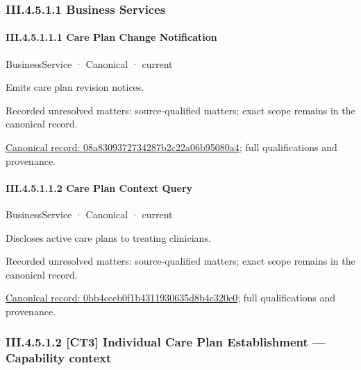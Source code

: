 \subsubsection*{III.4.5.1.1 Business Services}
\label{navigation:III.4.5.1.1}

\paragraph*{III.4.5.1.1.1 Care Plan Change Notification}
\label{navigation:III.4.5.1.1.1}

\label{element:08a8309372734287b2c22a06b95080a4}
{\small BusinessService · Canonical · current}\par

Emits care plan revision notices.


{\small Recorded unresolved matters: source-qualified matters; exact scope remains in the canonical record.}\par
{\footnotesize \href{../../../../../../../continuum/business/business-service/08a8309372734287b2c22a06b95080a4.md}{Canonical record: 08a8309372734287b2c22a06b95080a4}; full qualifications and provenance.}\par
\paragraph*{III.4.5.1.1.2 Care Plan Context Query}
\label{navigation:III.4.5.1.1.2}

\label{element:0bb4cceb0f1b4311930635d8b4c320e0}
{\small BusinessService · Canonical · current}\par

Discloses active care plans to treating clinicians.


{\small Recorded unresolved matters: source-qualified matters; exact scope remains in the canonical record.}\par
{\footnotesize \href{../../../../../../../continuum/business/business-service/0bb4cceb0f1b4311930635d8b4c320e0.md}{Canonical record: 0bb4cceb0f1b4311930635d8b4c320e0}; full qualifications and provenance.}\par
\subsubsection*{III.4.5.1.2 [CT3] Individual Care Plan Establishment — Capability context}
\label{navigation:III.4.5.1.2}


